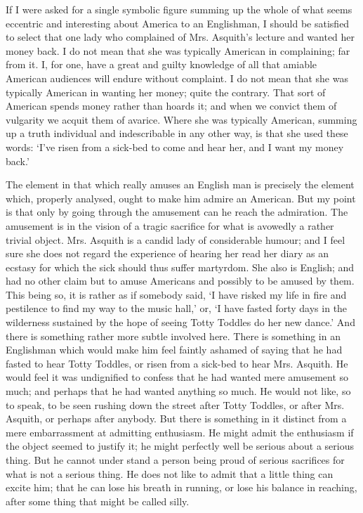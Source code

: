 \documentclass{book}
\begin{document}
If I were asked for a single symbolic figure summing up the whole of what seems eccentric and interesting about America to an Englishman, I should be satisfied to select that one lady who complained of Mrs. Asquith’s lecture and wanted her money back. I do not mean that she was typically American in complaining; far from it. I, for one, have a great and guilty knowledge of all that amiable American audiences will endure without complaint. I do not mean that she was typically American in wanting her money; quite the contrary. That sort of American spends money rather than hoards it; and when we convict them of vulgarity we acquit them of avarice. Where she was typically American, summing up a truth individual and indescribable in any other way, is that she used these words: ‘I’ve risen from a sick-bed to come and hear her, and I want my money back.’

The element in that which really amuses an English man is precisely the element which, properly analysed, ought to make him admire an American. But my point is that only by going through the amusement can he reach the admiration. The amusement is in the vision of a tragic sacrifice for what is avowedly a rather trivial object. Mrs. Asquith is a candid lady of considerable humour; and I feel sure she does not regard the experience of hearing her read her diary as an ecstasy for which the sick should thus suffer martyrdom. She also is English; and had no other claim but to amuse Americans and possibly to be amused by them. This being so, it is rather as if somebody said, ‘I have risked my life in fire and pestilence to find my way to the music hall,’ or, ‘I have fasted forty days in the wilderness sustained by the hope of seeing Totty Toddles do her new dance.’ And there is something rather more subtle involved here. There is something in an Englishman which would make him feel faintly ashamed of saying that he had fasted to hear Totty Toddles, or risen from a sick-bed to hear Mrs. Asquith. He would feel it was undignified to confess that he had wanted mere amusement so much; and perhaps that he had wanted anything so much. He would not like, so to speak, to be seen rushing down the street after Totty Toddles, or after Mrs. Asquith, or perhaps after anybody. But there is something in it distinct from a mere embarrassment at admitting enthusiasm. He might admit the enthusiasm if the object seemed to justify it; he might perfectly well be serious about a serious thing. But he cannot under stand a person being proud of serious sacrifices for what is not a serious thing. He does not like to admit that a little thing can excite him; that he can lose his breath in running, or lose his balance in reaching, after some thing that might be called silly.
\end{document}
